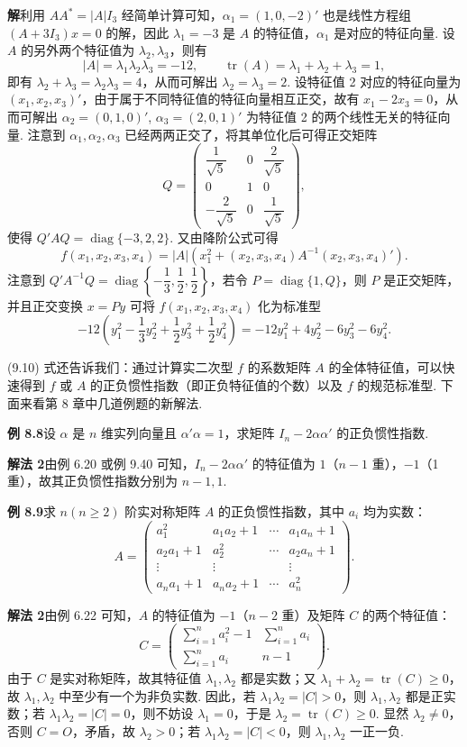 \documentclass[UTF8, 12pt, fontset=fandol, oneside]{ctexart}
\begin{document}
\noindent\textbf{解}\quad 利用 $AA^*=|A|I_3$ 经简单计算可知，$\alpha_1=(1,0,-2)'$ 也是线性方程组 $(A+3I_3)x=0$ 的解，因此 $\lambda_1=-3$ 是 $A$ 的特征值，$\alpha_1$ 是对应的特征向量. 设 $A$ 的另外两个特征值为 $\lambda_2,\lambda_3$，则有
\[
|A|=\lambda_1\lambda_2\lambda_3=-12,\qquad \operatorname{tr}(A)=\lambda_1+\lambda_2+\lambda_3=1,
\]
即有 $\lambda_2+\lambda_3=\lambda_2\lambda_3=4$，从而可解出 $\lambda_2=\lambda_3=2$. 设特征值 2 对应的特征向量为 $(x_1,x_2,x_3)'$，由于属于不同特征值的特征向量相互正交，故有 $x_1-2x_3=0$，从而可解出 $\alpha_2=(0,1,0)'$, $\alpha_3=(2,0,1)'$ 为特征值 2 的两个线性无关的特征向量. 注意到 $\alpha_1,\alpha_2,\alpha_3$ 已经两两正交了，将其单位化后可得正交矩阵
\[
Q=\begin{pmatrix}
\dfrac1{\sqrt5}&0&\dfrac2{\sqrt5}\\
0&1&0\\
-\dfrac2{\sqrt5}&0&\dfrac1{\sqrt5}
\end{pmatrix},
\]
使得 $Q'AQ=\operatorname{diag}\{-3,2,2\}$. 又由降阶公式可得
\[
f(x_1,x_2,x_3,x_4)=|A|\left(x_1^2+(x_2,x_3,x_4)A^{-1}(x_2,x_3,x_4)'\right).
\]
注意到 $Q'A^{-1}Q=\operatorname{diag}\left\{-\dfrac13,\dfrac12,\dfrac12\right\}$，若令 $P=\operatorname{diag}\{1,Q\}$，则 $P$ 是正交矩阵，并且正交变换 $x=Py$ 可将 $f(x_1,x_2,x_3,x_4)$ 化为标准型
\[
-12\left(y_1^2-\frac13y_2^2+\frac12y_3^2+\frac12y_4^2\right)=-12y_1^2+4y_2^2-6y_3^2-6y_4^2.
\]

(9.10) 式还告诉我们：通过计算实二次型 $f$ 的系数矩阵 $A$ 的全体特征值，可以快速得到 $f$ 或 $A$ 的正负惯性指数（即正负特征值的个数）以及 $f$ 的规范标准型. 下面来看第 8 章中几道例题的新解法.

\noindent\textbf{例 8.8}\quad 设 $\alpha$ 是 $n$ 维实列向量且 $\alpha'\alpha=1$，求矩阵 $I_n-2\alpha\alpha'$ 的正负惯性指数.

\noindent\textbf{解法 2}\quad 由例 6.20 或例 9.40 可知，$I_n-2\alpha\alpha'$ 的特征值为 $1$（$n-1$ 重），$-1$（1 重），故其正负惯性指数分别为 $n-1,1$.

\noindent\textbf{例 8.9}\quad 求 $n(n\ge2)$ 阶实对称矩阵 $A$ 的正负惯性指数，其中 $a_i$ 均为实数：
\[
A=\begin{pmatrix}
a_1^2&a_1a_2+1&\cdots&a_1a_n+1\\
a_2a_1+1&a_2^2&\cdots&a_2a_n+1\\
\vdots&\vdots&&\vdots\\
a_na_1+1&a_na_2+1&\cdots&a_n^2
\end{pmatrix}.
\]

\noindent\textbf{解法 2}\quad 由例 6.22 可知，$A$ 的特征值为 $-1$（$n-2$ 重）及矩阵 $C$ 的两个特征值：
\[
C=\begin{pmatrix}
\displaystyle\sum_{i=1}^na_i^2-1&\displaystyle\sum_{i=1}^na_i\\
\displaystyle\sum_{i=1}^na_i&n-1
\end{pmatrix}.
\]
由于 $C$ 是实对称矩阵，故其特征值 $\lambda_1,\lambda_2$ 都是实数；又 $\lambda_1+\lambda_2=\operatorname{tr}(C)\ge0$，故 $\lambda_1,\lambda_2$ 中至少有一个为非负实数. 因此，若 $\lambda_1\lambda_2=|C|>0$，则 $\lambda_1,\lambda_2$ 都是正实数；若 $\lambda_1\lambda_2=|C|=0$，则不妨设 $\lambda_1=0$，于是 $\lambda_2=\operatorname{tr}(C)\ge0$. 显然 $\lambda_2\ne0$，否则 $C=O$，矛盾，故 $\lambda_2>0$；若 $\lambda_1\lambda_2=|C|<0$，则 $\lambda_1,\lambda_2$ 一正一负.
\end{document}
